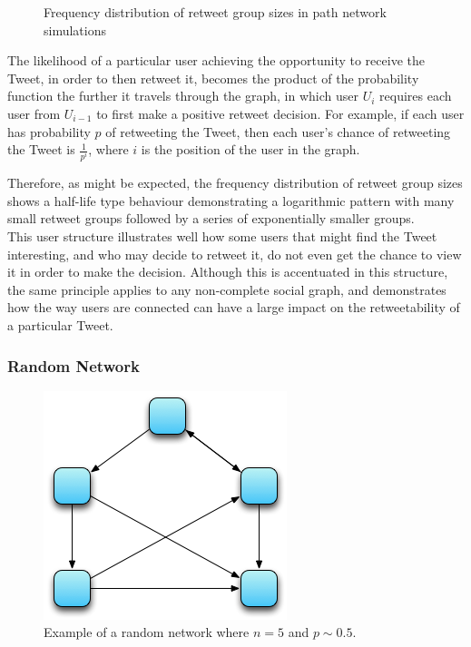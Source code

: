 \begin{figure}[h]
\centering
{}
\caption{Frequency distribution of retweet group sizes in path network simulations}
\label{fig:linear}
\end{figure}

The likelihood of a particular user achieving the opportunity to receive the Tweet, in order to then retweet it, becomes the product of the probability function the further it travels through the graph, in which user $U_i$ requires each user from $U_{i-1}$ to first make a positive retweet decision. For example, if each user has probability $p$ of retweeting the Tweet, then each user's chance of retweeting the Tweet is $\frac{1}{p^i}$, where $i$ is the position of the user in the graph.

Therefore, as might be expected, the frequency distribution of retweet group sizes shows a half-life type behaviour demonstrating a logarithmic pattern with many small retweet groups followed by a series of exponentially smaller groups.\\
This user structure illustrates well how some users that might find the Tweet interesting, and who may decide to retweet it, do not even get the chance to view it in order to make the decision. Although this is accentuated in this structure, the same principle applies to any non-complete social graph, and demonstrates how the way users are connected can have a large impact on the retweetability of a particular Tweet.


\subsubsection{Random Network}

\begin{figure}[h]
\centering
\includegraphics[scale=0.8]{4.Chapter2/Media/random_network.png} 
\caption{Example of a random network where $n = 5$ and $p \sim 0.5$.}
\label{fig:path_network}
\end{figure}


